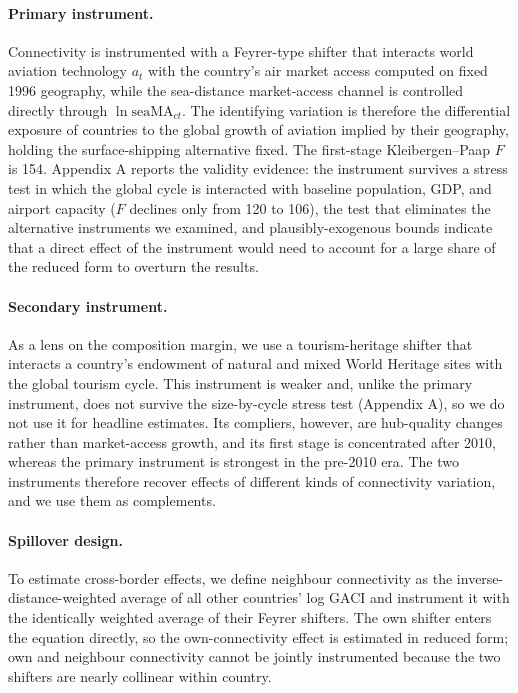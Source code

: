 \documentclass[12pt]{article}
\begin{document}
\paragraph{Primary instrument.} Connectivity is instrumented with a
Feyrer-type shifter that interacts world aviation technology $a_t$ with the
country's air market access computed on fixed 1996 geography, while the
sea-distance market-access channel is controlled directly through
$\ln \mathrm{seaMA}_{ct}$. The identifying variation is therefore the
differential exposure of countries to the global growth of aviation implied
by their geography, holding the surface-shipping alternative fixed. The
first-stage Kleibergen--Paap $F$ is 154. Appendix A reports the validity
evidence: the instrument survives a stress test in which the global cycle is
interacted with baseline population, GDP, and airport capacity ($F$ declines
only from 120 to 106), the test that eliminates the alternative instruments
we examined, and plausibly-exogenous bounds indicate that a direct effect of
the instrument would need to account for a large share of the reduced form
to overturn the results.

\paragraph{Secondary instrument.} As a lens on the composition margin, we
use a tourism-heritage shifter that interacts a country's endowment of
natural and mixed World Heritage sites with the global tourism cycle. This
instrument is weaker and, unlike the primary instrument, does not survive
the size-by-cycle stress test (Appendix A), so we do not use it for headline
estimates. Its compliers, however, are hub-quality changes rather than
market-access growth, and its first stage is concentrated after 2010,
whereas the primary instrument is strongest in the pre-2010 era.
The two instruments therefore recover effects of different kinds of
connectivity variation, and we use them as complements.

\paragraph{Spillover design.} To estimate cross-border effects, we define
neighbour connectivity as the inverse-distance-weighted average of all other
countries' log GACI and instrument it with the identically weighted average
of their Feyrer shifters. The own shifter enters the equation directly, so
the own-connectivity effect is estimated in reduced form; own and neighbour
connectivity cannot be jointly instrumented because the two shifters are
nearly collinear within country.
\end{document}
